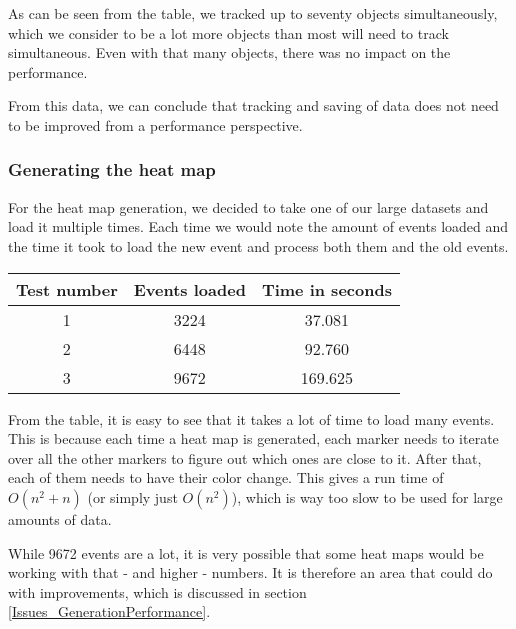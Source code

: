 As can be seen from the table, we tracked up to seventy objects simultaneously, which we consider to be a lot more objects than most will need to track simultaneous. Even with that many objects, there was no impact on the performance.

From this data, we can conclude that tracking and saving of data does not need to be improved from a performance perspective.

\subsubsection{Generating the heat map}
\label{Testing_Performance_Generating}

For the heat map generation, we decided to take one of our large datasets and load it multiple times. Each time we would note the amount of events loaded and the time it took to load the new event and process both them and the old events.

\begin{center}
	\begin{tabular}{| c | c | c |}
		\hline
		Test number & Events loaded & Time in seconds \\ \hline
		1 & 3224 & 37.081 \\ \hline
		2 & 6448 & 92.760 \\ \hline
		3 & 9672 & 169.625 \\
		\hline
	\end{tabular}
\end{center}

From the table, it is easy to see that it takes a lot of time to load many events. This is because each time a heat map is generated, each marker needs to iterate over all the other markers to figure out which ones are close to it. After that, each of them needs to have their color change. This gives a run time of $O(n^2 + n)$ (or simply just $O(n^2)$), which is way too slow to be used for large amounts of data.

While 9672 events are a lot, it is very possible that some heat maps would be working with that - and higher - numbers. It is therefore an area that could do with improvements, which is discussed in section \ref{Issues_GenerationPerformance}.